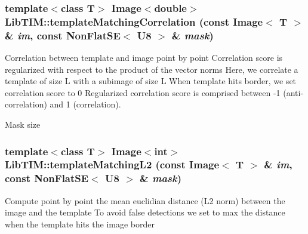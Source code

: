 \subsubsection{\setlength{\rightskip}{0pt plus 5cm}template$<$class T$>$ Image$<$double$>$ Lib\-TIM::template\-Matching\-Correlation (const Image$<$ T $>$ \& {\em im}, const Non\-Flat\-SE$<$ {\bf U8} $>$ \& {\em mask})}\label{group__templateMatching_ga2}


Correlation between template and image point by point Correlation score is regularized with respect to the product of the vector norms Here, we correlate a template of size L with a subimage of size L When template hits border, we set correlation score to 0 Regularized correlation score is comprised between -1 (anti-correlation) and 1 (correlation).

Mask size 
\subsubsection{\setlength{\rightskip}{0pt plus 5cm}template$<$class T$>$ Image$<$int$>$ Lib\-TIM::template\-Matching\-L2 (const Image$<$ T $>$ \& {\em im}, const Non\-Flat\-SE$<$ {\bf U8} $>$ \& {\em mask})}\label{group__templateMatching_ga0}


Compute point by point the mean euclidian distance (L2 norm) between the image and the template To avoid false detections we set to max the distance when the template hits the image border 